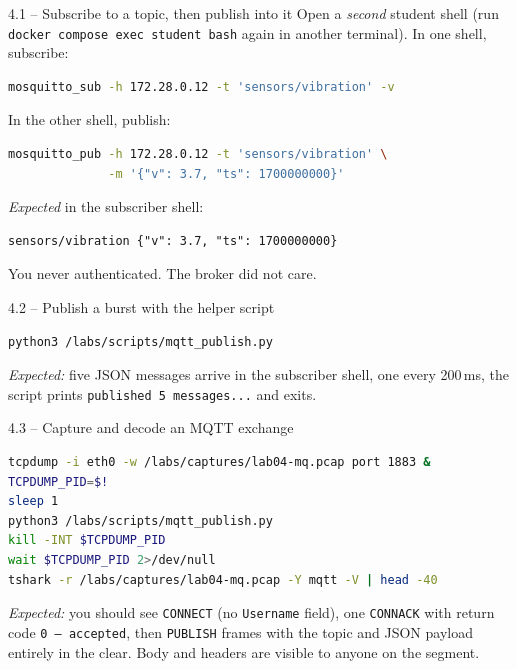 \documentclass[11pt,a4paper]{article}
\begin{document}
\begin{stepbox}{4.1 -- Subscribe to a topic, then publish into it}
Open a \emph{second} student shell (run \texttt{docker compose exec
student bash} again in another terminal). In one shell, subscribe:
\begin{lstlisting}[language=bash]
mosquitto_sub -h 172.28.0.12 -t 'sensors/vibration' -v
\end{lstlisting}
In the other shell, publish:
\begin{lstlisting}[language=bash]
mosquitto_pub -h 172.28.0.12 -t 'sensors/vibration' \
              -m '{"v": 3.7, "ts": 1700000000}'
\end{lstlisting}
\emph{Expected} in the subscriber shell:
\begin{lstlisting}
sensors/vibration {"v": 3.7, "ts": 1700000000}
\end{lstlisting}
You never authenticated. The broker did not care.
\end{stepbox}

\begin{stepbox}{4.2 -- Publish a burst with the helper script}
\begin{lstlisting}[language=bash]
python3 /labs/scripts/mqtt_publish.py
\end{lstlisting}
\emph{Expected:} five JSON messages arrive in the subscriber shell, one
every 200\,ms, the script prints \texttt{published 5 messages...} and
exits.
\end{stepbox}

\begin{stepbox}{4.3 -- Capture and decode an MQTT exchange}
\begin{lstlisting}[language=bash]
tcpdump -i eth0 -w /labs/captures/lab04-mq.pcap port 1883 &
TCPDUMP_PID=$!
sleep 1
python3 /labs/scripts/mqtt_publish.py
kill -INT $TCPDUMP_PID
wait $TCPDUMP_PID 2>/dev/null
tshark -r /labs/captures/lab04-mq.pcap -Y mqtt -V | head -40
\end{lstlisting}
\emph{Expected:} you should see \texttt{CONNECT} (no \texttt{Username}
field), one \texttt{CONNACK} with return code \texttt{0 -- accepted},
then \texttt{PUBLISH} frames with the topic and JSON payload entirely in
the clear. Body and headers are visible to anyone on the segment.
\end{stepbox}
\end{document}
